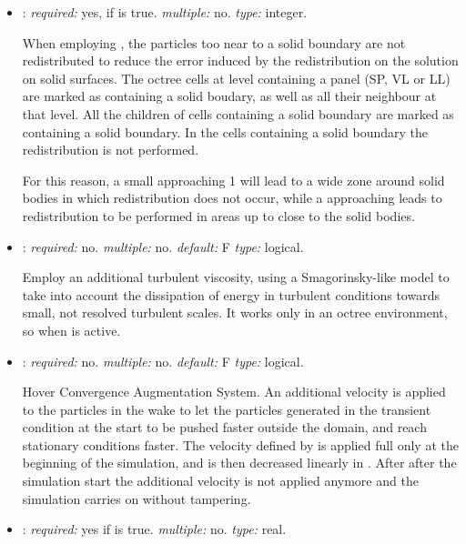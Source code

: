\begin{itemize}
\item {}: \textit{required:} yes, if 
 is true. \textit{multiple:} no. 
\textit{type:} integer.

When employing , the particles too near 
to a solid boundary are not redistributed to reduce the error induced by 
the redistribution on the solution on solid surfaces. The octree cells at 
level  containing a panel (SP, VL or LL) are marked 
as containing a solid boudary, as well as all their neighbour at that level. 
All the children of cells containing a solid boundary are marked as containing 
a solid boundary. In the cells containing a solid boundary the redistribution 
is not performed.

For this reason, a small  approaching 1 will lead 
to a wide zone around solid bodies in which redistribution does not occur, 
while a  approaching  leads 
to redistribution to be performed in areas up to close to the solid bodies.

\item {}: \textit{required:} no. \textit{multiple:} no. 
\textit{default:} F \textit{type:} logical.

Employ an additional turbulent viscosity, using a Smagorinsky-like model to 
take into account the dissipation of energy in turbulent conditions towards 
small, not resolved turbulent scales. It works only in an octree environment, 
so when  is active.

\item {}: \textit{required:} no. \textit{multiple:} no. 
\textit{default:} F \textit{type:} logical.

Hover Convergence Augmentation System. An additional velocity is applied 
to the particles in the wake to let the particles generated in the transient 
condition at the start to be pushed faster outside the domain, and reach 
stationary conditions faster. The velocity defined by  
is applied full only at the beginning of the simulation, and is then decreased 
linearly in . After  after the simulation 
start the additional velocity is not applied anymore and the simulation carries 
on without tampering. 

\item {}: \textit{required:} yes if  is true. 
\textit{multiple:} no. \textit{type:} real.


\end{itemize}
